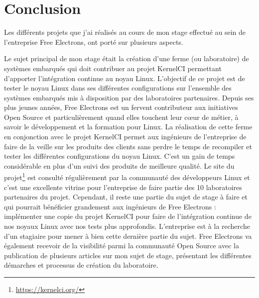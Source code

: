\chapter*{Conclusion}

Les différents projets que j'ai réalisés au cours de mon stage effectué au sein de l'entreprise Free Electrons, ont porté sur plusieurs aspects.

Le sujet principal de mon stage était la création d'une ferme (ou laboratoire) de systèmes embarqués qui doit contribuer au projet KernelCI permettant d'apporter l'intégration continue au noyau Linux. L'objectif de ce projet est de tester le noyau Linux dans ses différentes configurations sur l'ensemble des systèmes embarqués mis à disposition par des laboratoires partenaires. Depuis ses plus jeunes années, Free Electrons est un fervent contributeur aux initiatives Open Source et particulièrement quand elles touchent leur c\oe{}ur de métier, à savoir le développement et la formation pour Linux. La réalisation de cette ferme en conjonction avec le projet KernelCI permet aux ingénieurs de l'entreprise de faire de la veille sur les produits des clients sans perdre le temps de recompiler et tester les différentes configurations du noyau Linux. C'est un gain de temps considérable en plus d'un suivi des produits de meilleure qualité. Le site du projet\footnote{\url{https://kernelci.org/}} est consulté régulièrement par la communauté des développeurs Linux et c'est une excellente vitrine pour l'entreprise de faire partie des 10 laboratoires partenaires du projet. Cependant, il reste une partie du sujet de stage à faire et qui pourrait bénéficier grandement aux ingénieurs de Free Electrons : implémenter une copie du projet KernelCI pour faire de l'intégration continue de nos noyaux Linux avec nos tests plus approfondis. L'entreprise est à la recherche d'un stagiaire pour mener à bien cette dernière partie du sujet. Free Electrons va également recevoir de la visibilité parmi la communauté Open Source avec la publication de plusieurs articles sur mon sujet de stage, présentant les différentes démarches et processus de création du laboratoire.

